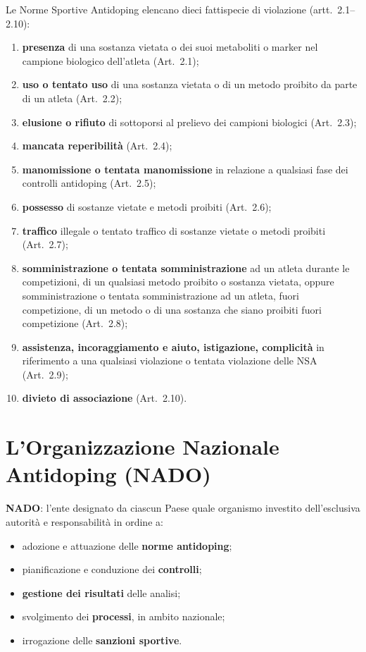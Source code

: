 Le Norme Sportive Antidoping elencano dieci fattispecie di violazione (artt.\ 2.1--2.10):
\begin{enumerate}
  \item \textbf{presenza} di una sostanza vietata o dei suoi metaboliti o marker nel campione
    biologico dell'atleta (Art.\ 2.1);
  \item \textbf{uso o tentato uso} di una sostanza vietata o di un metodo proibito da parte di
    un atleta (Art.\ 2.2);
  \item \textbf{elusione o rifiuto} di sottoporsi al prelievo dei campioni biologici (Art.\ 2.3);
  \item \textbf{mancata reperibilità} (Art.\ 2.4);
  \item \textbf{manomissione o tentata manomissione} in relazione a qualsiasi fase dei controlli
    antidoping (Art.\ 2.5);
  \item \textbf{possesso} di sostanze vietate e metodi proibiti (Art.\ 2.6);
  \item \textbf{traffico} illegale o tentato traffico di sostanze vietate o metodi proibiti
    (Art.\ 2.7);
  \item \textbf{somministrazione o tentata somministrazione} ad un atleta durante le
    competizioni, di un qualsiasi metodo proibito o sostanza vietata, oppure somministrazione o
    tentata somministrazione ad un atleta, fuori competizione, di un metodo o di una sostanza che
    siano proibiti fuori competizione (Art.\ 2.8);
  \item \textbf{assistenza, incoraggiamento e aiuto, istigazione, complicità} in riferimento a
    una qualsiasi violazione o tentata violazione delle NSA (Art.\ 2.9);
  \item \textbf{divieto di associazione} (Art.\ 2.10).
\end{enumerate}

\section{L'Organizzazione Nazionale Antidoping (NADO)}

\textbf{NADO}: l'ente designato da ciascun Paese quale organismo investito dell'esclusiva
autorità e responsabilità in ordine a:
\begin{itemize}
  \item adozione e attuazione delle \textbf{norme antidoping};
  \item pianificazione e conduzione dei \textbf{controlli};
  \item \textbf{gestione dei risultati} delle analisi;
  \item svolgimento dei \textbf{processi}, in ambito nazionale;
  \item irrogazione delle \textbf{sanzioni sportive}.
\end{itemize}


